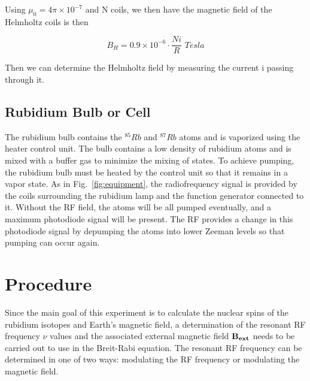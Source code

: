 \documentclass[%
 aip,
rsi,%
 amsmath,amssymb,
 reprint,%
author-numerical,%
]{revtex4-1}
\begin{document}
Using $\mu_{0}=4\pi \times 10^{-7}$ and N coils, we then have the magnetic field of the Helmholtz coils is then

\begin{equation}
B _ { H } = 0.9 \times 10 ^ { - 6 } \cdot \frac { N i } { R } \,\, Tesla
\label{eq:eleven}
\end{equation}

\noindent Then we can determine the Helmholtz field by measuring the current i passing through it.

\subsection{Rubidium Bulb or Cell}
The rubidium bulb contains the $^{85}Rb$ and $^{87}Rb$ atoms and is vaporized using the heater control unit. The bulb contains a low density of rubidium atoms and is mixed with a buffer gas to minimize the mixing of states. To achieve pumping, the rubidium bulb must be heated by the control unit so that it remains in a vapor state. \newline 
\indent As in Fig.~\ref{fig:equipment}, the radiofrequency signal is provided by the coils surrounding the rubidium lamp and the function generator connected to it.  Without the RF field, the atoms will be all pumped eventually, and a maximum photodiode signal will be present. The RF provides a change in this photodiode signal by  depumping the atoms into lower Zeeman levels so that pumping can occur again.



\section{Procedure} \label{4}
Since the main goal of this experiment is to calculate the nuclear spins of the rubidium isotopes and Earth's magnetic field, a determination of the resonant RF frequency $\nu$ values and the associated external magnetic field $\bf{B}_{ext}$ needs to be carried out to use in the Breit-Rabi equation. The resonant RF frequency can be determined in one of two ways: modulating the RF frequency or modulating the magnetic field. 
\end{document}
